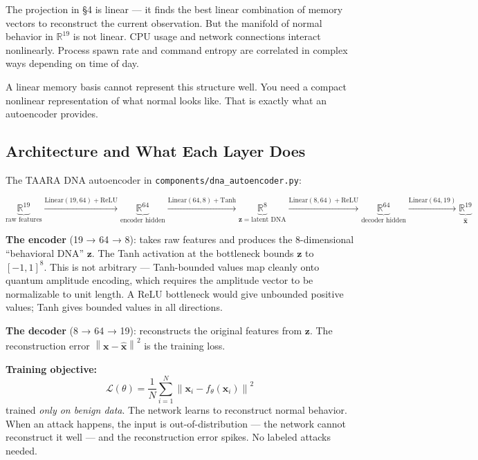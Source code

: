\documentclass[11pt,a4paper]{article}
\newcommand{\norm}[1]{\left\lVert#1\right\rVert}
\begin{document}
The projection in \S4 is linear — it finds the best linear combination of memory vectors to reconstruct the current observation. But the manifold of normal behavior in $\mathbb{R}^{19}$ is not linear. CPU usage and network connections interact nonlinearly. Process spawn rate and command entropy are correlated in complex ways depending on time of day.

A linear memory basis cannot represent this structure well. You need a compact nonlinear representation of what normal looks like. That is exactly what an autoencoder provides.

\subsection{Architecture and What Each Layer Does}

The TAARA DNA autoencoder in \texttt{components/dna\_autoencoder.py}:

\[
\underbrace{\mathbb{R}^{19}}_{\text{raw features}} \xrightarrow{\text{Linear}(19,64) + \text{ReLU}} \underbrace{\mathbb{R}^{64}}_{\text{encoder hidden}} \xrightarrow{\text{Linear}(64,8) + \text{Tanh}} \underbrace{\mathbb{R}^{8}}_{\mathbf{z} = \text{latent DNA}} \xrightarrow{\text{Linear}(8,64) + \text{ReLU}} \underbrace{\mathbb{R}^{64}}_{\text{decoder hidden}} \xrightarrow{\text{Linear}(64,19)} \underbrace{\mathbb{R}^{19}}_{\hat{\mathbf{x}}}
\]

\textbf{The encoder} (19 → 64 → 8): takes raw features and produces the 8-dimensional ``behavioral DNA'' $\mathbf{z}$. The Tanh activation at the bottleneck bounds $\mathbf{z}$ to $[-1, 1]^8$. This is not arbitrary — Tanh-bounded values map cleanly onto quantum amplitude encoding, which requires the amplitude vector to be normalizable to unit length. A ReLU bottleneck would give unbounded positive values; Tanh gives bounded values in all directions.

\textbf{The decoder} (8 → 64 → 19): reconstructs the original features from $\mathbf{z}$. The reconstruction error $\norm{\mathbf{x} - \hat{\mathbf{x}}}^2$ is the training loss.

\textbf{Training objective:}
\[
\mathcal{L}(\theta) = \frac{1}{N} \sum_{i=1}^N \norm{\mathbf{x}_i - f_\theta(\mathbf{x}_i)}^2
\]
trained \textit{only on benign data}. The network learns to reconstruct normal behavior. When an attack happens, the input is out-of-distribution — the network cannot reconstruct it well — and the reconstruction error spikes. No labeled attacks needed.
\end{document}
